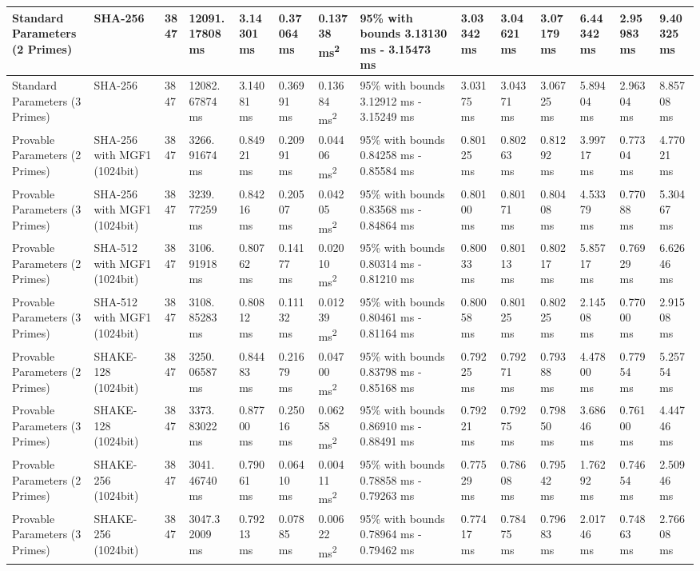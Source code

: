\documentclass[]{final_report}
\theoremstyle{definition}
\begin{document}
\begin{landscape}
\begin{longtable}{|p{2.3cm}|p{1.8cm}|p{1.0cm}|p{1.7cm}|p{1.4cm}|p{1.5cm}|p{1.8cm}|p{1.5cm}|p{1.43cm}|p{1.5cm}|p{1.3cm}|p{1.4cm}|p{1.3cm}|p{1.3cm}|}
\hline
\endlastfoot
Standard Parameters (2 Primes) & SHA-256 & 3847 & 12091.
17808 ms & 3.14301 ms & 0.37064 ms & 0.13738 ms\textsuperscript{2} & 95\% with bounds 3.13130 ms - 3.15473 ms & 3.03342 ms & 3.04621 ms & 3.07179 ms & 6.44342 ms & 2.95983 ms & 9.40325 ms \\
\hline
Standard Parameters (3 Primes) & SHA-256 & 3847 & 12082.
67874 ms & 3.14081 ms & 0.36991 ms & 0.13684 ms\textsuperscript{2} & 95\% with bounds 3.12912 ms - 3.15249 ms & 3.03175 ms & 3.04371 ms & 3.06725 ms & 5.89404 ms & 2.96304 ms & 8.85708 ms \\
\hline
Provable Parameters (2 Primes) & SHA-256 with MGF1 (1024bit) & 3847 & 3266.
91674 ms & 0.84921 ms & 0.20991 ms & 0.04406 ms\textsuperscript{2} & 95\% with bounds 0.84258 ms - 0.85584 ms & 0.80125 ms & 0.80263 ms & 0.81292 ms & 3.99717 ms & 0.77304 ms & 4.77021 ms \\
\hline
Provable Parameters (3 Primes) & SHA-256 with MGF1 (1024bit) & 3847 & 3239.
77259 ms & 0.84216 ms & 0.20507 ms & 0.04205 ms\textsuperscript{2} & 95\% with bounds 0.83568 ms - 0.84864 ms & 0.80100 ms & 0.80171 ms & 0.80408 ms & 4.53379 ms & 0.77088 ms & 5.30467 ms \\
\hline
Provable Parameters (2 Primes) & SHA-512 with MGF1 (1024bit) & 3847 & 3106.
91918 ms & 0.80762 ms & 0.14177 ms & 0.02010 ms\textsuperscript{2} & 95\% with bounds 0.80314 ms - 0.81210 ms & 0.80033 ms & 0.80113 ms & 0.80217 ms & 5.85717 ms & 0.76929 ms & 6.62646 ms \\
\hline
Provable Parameters (3 Primes) & SHA-512 with MGF1 (1024bit) & 3847 & 3108.
85283 ms & 0.80812 ms & 0.11132 ms & 0.01239 ms\textsuperscript{2} & 95\% with bounds 0.80461 ms - 0.81164 ms & 0.80058 ms & 0.80125 ms & 0.80225 ms & 2.14508 ms & 0.77000 ms & 2.91508 ms \\
\hline
Provable Parameters (2 Primes) & SHAKE-128 (1024bit) & 3847 & 3250.
06587 ms & 0.84483 ms & 0.21679 ms & 0.04700 ms\textsuperscript{2} & 95\% with bounds 0.83798 ms - 0.85168 ms & 0.79225 ms & 0.79271 ms & 0.79388 ms & 4.47800 ms & 0.77954 ms & 5.25754 ms \\
\hline
Provable Parameters (3 Primes) & SHAKE-128 (1024bit) & 3847 & 3373.
83022 ms & 0.87700 ms & 0.25016 ms & 0.06258 ms\textsuperscript{2} & 95\% with bounds 0.86910 ms - 0.88491 ms & 0.79221 ms & 0.79275 ms & 0.79850 ms & 3.68646 ms & 0.76100 ms & 4.44746 ms \\
\hline
Provable Parameters (2 Primes) & SHAKE-256 (1024bit) & 3847 & 3041.
46740 ms & 0.79061 ms & 0.06410 ms & 0.00411 ms\textsuperscript{2} & 95\% with bounds 0.78858 ms - 0.79263 ms & 0.77529 ms & 0.78608 ms & 0.79542 ms & 1.76292 ms & 0.74654 ms & 2.50946 ms \\
\hline
Provable Parameters (3 Primes) & SHAKE-256 (1024bit) & 3847 & 3047.3
2009 ms & 0.79213 ms & 0.07885 ms & 0.00622 ms\textsuperscript{2} & 95\% with bounds 0.78964 ms - 0.79462 ms & 0.77417 ms & 0.78475 ms & 0.79683 ms & 2.01746 ms & 0.74863 ms & 2.76608 ms \\
\hline





\end{longtable}
\end{landscape}
\end{document}

